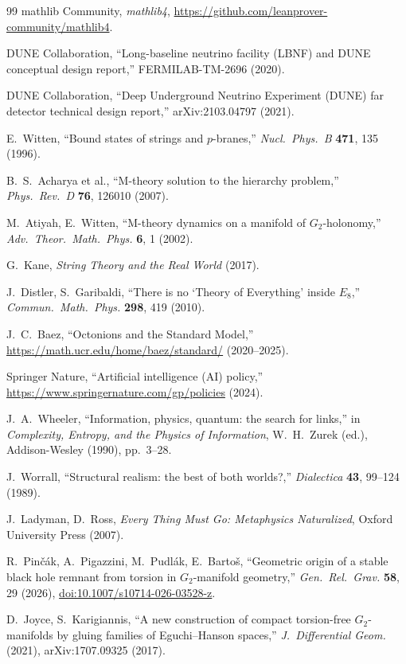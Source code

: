 \begin{thebibliography}{99}
 mathlib Community, \textit{mathlib4}, \url{https://github.com/leanprover-community/mathlib4}.

 DUNE Collaboration, ``Long-baseline neutrino facility (LBNF) and DUNE conceptual design report,'' FERMILAB-TM-2696 (2020).

 DUNE Collaboration, ``Deep Underground Neutrino Experiment (DUNE) far detector technical design report,'' arXiv:2103.04797 (2021).

 E.~Witten, ``Bound states of strings and $p$-branes,'' \textit{Nucl.\ Phys.\ B} \textbf{471}, 135 (1996).

 B.~S.~Acharya et al., ``M-theory solution to the hierarchy problem,'' \textit{Phys.\ Rev.\ D} \textbf{76}, 126010 (2007).

 M.~Atiyah, E.~Witten, ``M-theory dynamics on a manifold of $G_2$-holonomy,'' \textit{Adv.\ Theor.\ Math.\ Phys.} \textbf{6}, 1 (2002).

 G.~Kane, \textit{String Theory and the Real World} (2017).

 J.~Distler, S.~Garibaldi, ``There is no `Theory of Everything' inside $E_8$,'' \textit{Commun.\ Math.\ Phys.} \textbf{298}, 419 (2010).

 J.~C.~Baez, ``Octonions and the Standard Model,'' \url{https://math.ucr.edu/home/baez/standard/} (2020--2025).

 Springer Nature, ``Artificial intelligence (AI) policy,'' \url{https://www.springernature.com/gp/policies} (2024).

 J.~A.~Wheeler, ``Information, physics, quantum: the search for links,'' in \textit{Complexity, Entropy, and the Physics of Information}, W.~H.~Zurek (ed.), Addison-Wesley (1990), pp.~3--28.

 J.~Worrall, ``Structural realism: the best of both worlds?,'' \textit{Dialectica} \textbf{43}, 99--124 (1989).

 J.~Ladyman, D.~Ross, \textit{Every Thing Must Go: Metaphysics Naturalized}, Oxford University Press (2007).

 R.~Pin\v{c}\'ak, A.~Pigazzini, M.~Pudl\'ak, E.~Barto\v{s}, ``Geometric origin of a stable black hole remnant from torsion in $G_2$-manifold geometry,'' \textit{Gen.\ Rel.\ Grav.} \textbf{58}, 29 (2026), \href{https://doi.org/10.1007/s10714-026-03528-z}{doi:10.1007/s10714-026-03528-z}.

 D.~Joyce, S.~Karigiannis, ``A new construction of compact torsion-free $G_2$-manifolds by gluing families of Eguchi--Hanson spaces,'' \textit{J.\ Differential Geom.} (2021), arXiv:1707.09325 (2017).


\end{thebibliography}
